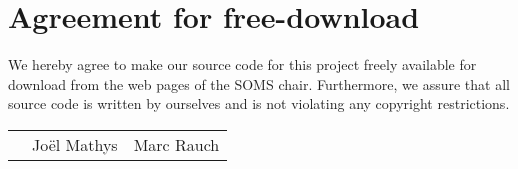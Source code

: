\documentclass[11pt]{article}
\begin{document}

\newpage


\newpage
\section*{Agreement for free-download}
\bigskip


\bigskip


\large We hereby agree to make our source code for this project freely available for download from the web pages of the SOMS chair. Furthermore, we assure that all source code is written by ourselves and is not violating any copyright restrictions.

\begin{center}

\bigskip


\bigskip


\begin{tabular}{@{}p{3.3cm}@{}p{6cm}@{}@{}p{6cm}@{}}
\begin{minipage}{3cm}

\end{minipage}
&
\begin{minipage}{6cm}
\vspace{2mm} \large Jo\"el Mathys

 \vspace{\baselineskip}

\end{minipage}
&
\begin{minipage}{6cm}

\large Marc Rauch 

\end{minipage}
\end{tabular}


\end{center}
\newpage






\tableofcontents

\newpage

\end{document}
